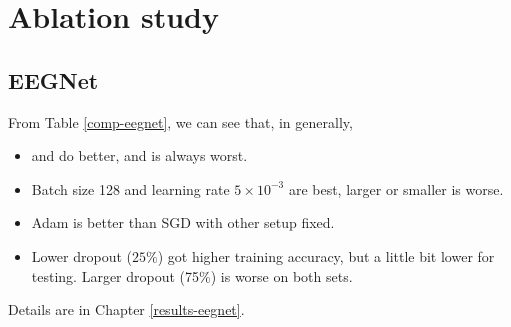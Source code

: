 
\pagebreak
\section{Ablation study}
\subsection{EEGNet}
	From Table \ref{comp-eegnet}, we can see that, in generally, 
	\begin{itemize}
		\item {} and  do better, and  is always worst. 
		\item Batch size 128 and learning rate $5 \times 10^{-3}$ are best, larger or smaller is worse.
		\item Adam is better than SGD with other setup fixed.
		\item Lower dropout ($25\%$) got higher training accuracy, but a little bit lower for testing. Larger dropout (75\%) is worse on both sets.
	\end{itemize}
	Details are in Chapter \ref{results-eegnet}.


